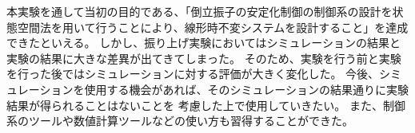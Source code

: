 本実験を通して当初の目的である、「倒立振子の安定化制御の制御系の設計を状態空間法を用いて行うことにより、線形時不変システムを設計すること」を達成できたといえる。
しかし、振り上げ実験においてはシミュレーションの結果と実験の結果に大きな差異が出てきてしまった。
そのため、実験を行う前と実験を行った後ではシミュレーションに対する評価が大きく変化した。
今後、シミュレーションを使用する機会があれば、そのシミュレーションの結果通りに実験結果が得られることはないことを
考慮した上で使用していきたい。
また、制御系のツールや数値計算ツールなどの使い方も習得することができた。